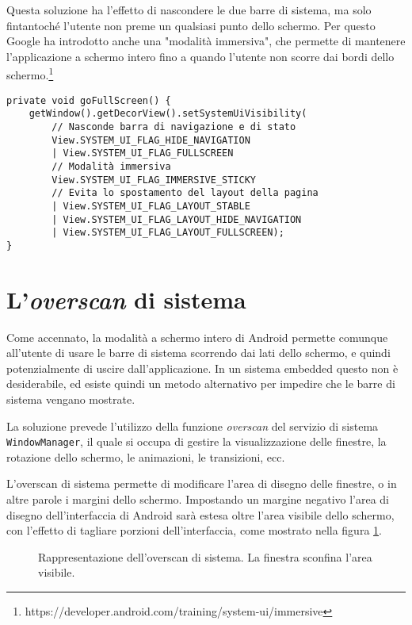 Questa soluzione ha l'effetto di nascondere le due barre di sistema, ma solo fintantoché l'utente non preme un qualsiasi punto dello schermo. Per questo Google ha introdotto anche una "modalità immersiva", che permette di mantenere l'applicazione a schermo intero fino a quando l'utente non scorre dai bordi dello schermo.\footnote{https://developer.android.com/training/system-ui/immersive}

\begin{verbatim}
private void goFullScreen() {
    getWindow().getDecorView().setSystemUiVisibility(
        // Nasconde barra di navigazione e di stato
        View.SYSTEM_UI_FLAG_HIDE_NAVIGATION
        | View.SYSTEM_UI_FLAG_FULLSCREEN
        // Modalità immersiva
        View.SYSTEM_UI_FLAG_IMMERSIVE_STICKY
        // Evita lo spostamento del layout della pagina
        | View.SYSTEM_UI_FLAG_LAYOUT_STABLE
        | View.SYSTEM_UI_FLAG_LAYOUT_HIDE_NAVIGATION
        | View.SYSTEM_UI_FLAG_LAYOUT_FULLSCREEN);
}
\end{verbatim}


\section{L'\emph{overscan} di sistema}
\label{sec:kiosk_overscan}

Come accennato, la modalità a schermo intero di Android permette comunque all'utente di usare le barre di sistema scorrendo dai lati dello schermo, e quindi potenzialmente di uscire dall'applicazione. In un sistema embedded questo non è desiderabile, ed esiste quindi un metodo alternativo per impedire che le barre di sistema vengano mostrate.

La soluzione prevede l'utilizzo della funzione \emph{overscan} del servizio di sistema \texttt{WindowManager}, il quale si occupa di gestire la visualizzazione delle finestre, la rotazione dello schermo, le animazioni, le transizioni, ecc.

L'overscan di sistema permette di modificare l'area di disegno delle finestre, o in altre parole i margini dello schermo. Impostando un margine negativo l'area di disegno dell'interfaccia di Android sarà estesa oltre l'area visibile dello schermo, con l'effetto di tagliare porzioni dell'interfaccia, come mostrato nella figura \ref{fig:overscan}.

\begin{figure}[h]
	\centering
	
	\scalebox{0.5} {
	}

	\caption{Rappresentazione dell'overscan di sistema. La finestra sconfina l'area visibile.}
	\label{fig:overscan}
\end{figure}

